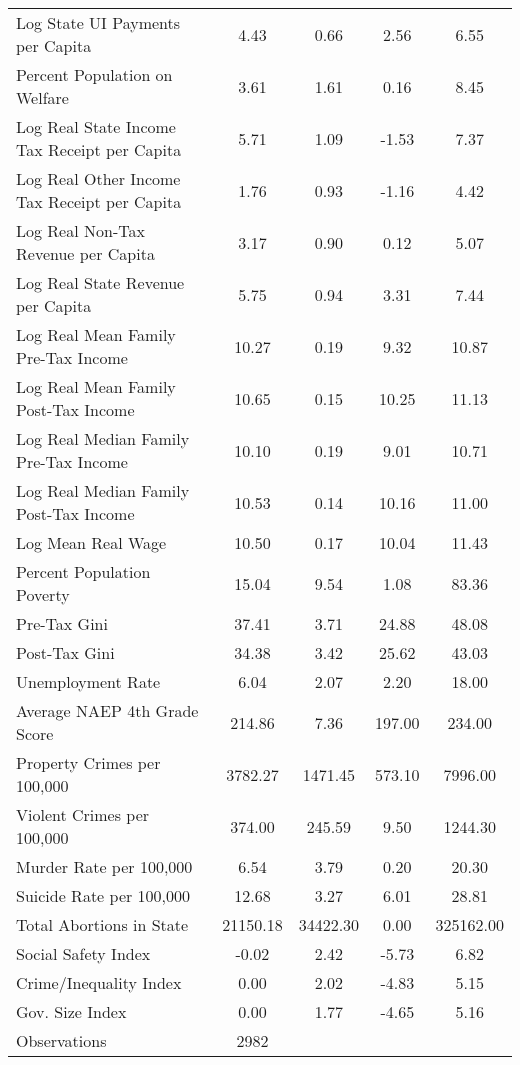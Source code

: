 \begin{tabular}{l*{1}{cccc}}
Log State UI Payments per Capita&        4.43&        0.66&        2.56&        6.55\\
Percent Population on Welfare&        3.61&        1.61&        0.16&        8.45\\
Log Real State Income Tax Receipt per Capita&        5.71&        1.09&       -1.53&        7.37\\
Log Real Other Income Tax Receipt per Capita&        1.76&        0.93&       -1.16&        4.42\\
Log Real Non-Tax Revenue per Capita&        3.17&        0.90&        0.12&        5.07\\
Log Real State Revenue per Capita&        5.75&        0.94&        3.31&        7.44\\
Log Real Mean Family Pre-Tax Income&       10.27&        0.19&        9.32&       10.87\\
Log Real Mean Family Post-Tax Income&       10.65&        0.15&       10.25&       11.13\\
Log Real Median Family Pre-Tax Income&       10.10&        0.19&        9.01&       10.71\\
Log Real Median Family Post-Tax Income&       10.53&        0.14&       10.16&       11.00\\
Log Mean Real Wage  &       10.50&        0.17&       10.04&       11.43\\
Percent Population Poverty&       15.04&        9.54&        1.08&       83.36\\
Pre-Tax Gini        &       37.41&        3.71&       24.88&       48.08\\
Post-Tax Gini       &       34.38&        3.42&       25.62&       43.03\\
Unemployment Rate   &        6.04&        2.07&        2.20&       18.00\\
Average NAEP 4th Grade Score&      214.86&        7.36&      197.00&      234.00\\
Property Crimes per 100,000&     3782.27&     1471.45&      573.10&     7996.00\\
Violent Crimes per 100,000&      374.00&      245.59&        9.50&     1244.30\\
Murder Rate per 100,000&        6.54&        3.79&        0.20&       20.30\\
Suicide Rate per 100,000&       12.68&        3.27&        6.01&       28.81\\
Total Abortions in State&    21150.18&    34422.30&        0.00&   325162.00\\
Social Safety Index &       -0.02&        2.42&       -5.73&        6.82\\
Crime/Inequality Index&        0.00&        2.02&       -4.83&        5.15\\
Gov. Size Index     &        0.00&        1.77&       -4.65&        5.16\\
\midrule
Observations        &        2982&            &            &            \\
\bottomrule
\end{tabular}
